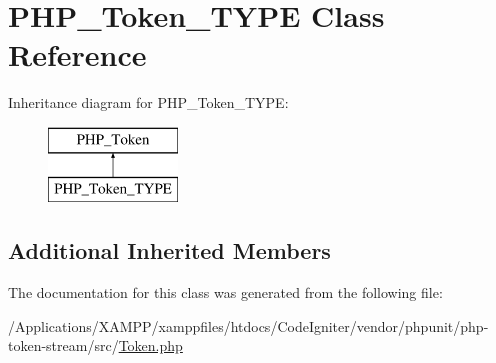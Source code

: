 \hypertarget{class_p_h_p___token___t_y_p_e}{}\section{P\+H\+P\+\_\+\+Token\+\_\+\+T\+Y\+PE Class Reference}
\label{class_p_h_p___token___t_y_p_e}
Inheritance diagram for P\+H\+P\+\_\+\+Token\+\_\+\+T\+Y\+PE\+:\begin{figure}[H]
\begin{center}
\leavevmode
\includegraphics[height=2.000000cm]{class_p_h_p___token___t_y_p_e}
\end{center}
\end{figure}
\subsection*{Additional Inherited Members}


The documentation for this class was generated from the following file\+:\begin{DoxyCompactItemize}
\item 
/\+Applications/\+X\+A\+M\+P\+P/xamppfiles/htdocs/\+Code\+Igniter/vendor/phpunit/php-\/token-\/stream/src/\mbox{\hyperlink{_token_8php}{Token.\+php}}\end{DoxyCompactItemize}
